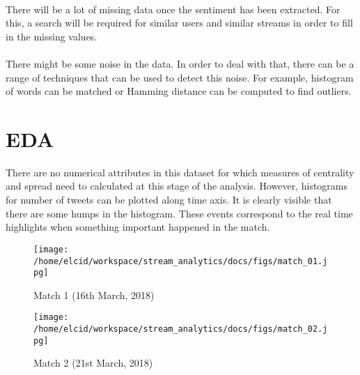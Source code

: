 \documentclass[11pt]{article}
\begin{document}
\paragraph{}
There will be a lot of missing data once the sentiment has been extracted. For this, a search will be required for similar users and similar streams in order to fill in the missing values.
\paragraph{}
There might be some noise in the data. In order to deal with that, there can be a range of techniques that can be used to detect this noise. For example, histogram of words can be matched or Hamming distance can be computed to find outliers.

\section{EDA}
There are no numerical attributes in this dataset for which measures of centrality and spread need to calculated at this stage of the analysis. However, histograms for number of tweets can be plotted along time axis. It is clearly visible that there are some humps in the histogram. These events correspond to the real time highlights when something important happened in the match.

\begin{figure}[ht]
	\texttt{[image: /home/elcid/workspace/stream\_analytics/docs/figs/match\_01.jpg]}
	\caption{Match 1 (16th March, 2018)}
\end{figure}
\begin{figure}[ht]
	\texttt{[image: /home/elcid/workspace/stream\_analytics/docs/figs/match\_02.jpg]}
	\caption{Match 2 (21st March, 2018)}
\end{figure}
	
\end{document}
